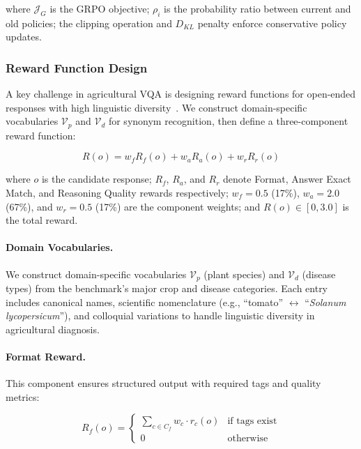 \documentclass[sigconf,anonymous,review]{acmart}
\begin{document}
\noindent where \(\mathcal{J}_G\) is the GRPO objective; \(\rho_i\) is the probability ratio between current and old policies; the clipping operation and $D_{KL}$ penalty enforce conservative policy updates.

\subsubsection{Reward Function Design}
\label{sec:reward}

A key challenge in agricultural VQA is designing reward functions for open-ended responses with high linguistic diversity~\cite{qian2025toolrl,eschmann2021reward,liu2024multimodal,lai2025med,pan2025medvlm}. We construct domain-specific vocabularies $\mathcal{V}_p$ and $\mathcal{V}_d$ for synonym recognition, then define a three-component reward function:

\begin{equation}
R(o) = w_f R_f(o) + w_a R_a(o) + w_r R_r(o)
\label{eq:total_reward}
\end{equation}

\noindent where $o$ is the candidate response; $R_f$, $R_a$, and $R_r$ denote Format, Answer Exact Match, and Reasoning Quality rewards respectively; $w_f=0.5$ (17\%), $w_a=2.0$ (67\%), and $w_r=0.5$ (17\%) are the component weights; and $R(o) \in [0, 3.0]$ is the total reward.

\paragraph{Domain Vocabularies.}
We construct domain-specific vocabularies $\mathcal{V}_p$ (plant species) and $\mathcal{V}_d$ (disease types) from the benchmark's major crop and disease categories. Each entry includes canonical names, scientific nomenclature (e.g., ``tomato'' $\leftrightarrow$ ``\emph{Solanum lycopersicum}''), and colloquial variations to handle linguistic diversity in agricultural diagnosis.


\paragraph{Format Reward.}
This component ensures structured output with required tags and quality metrics:

\begin{equation}
R_f(o) = \begin{cases}
\sum_{c \in C_f} w_c \cdot r_c(o) & \text{if tags exist} \\
0 & \text{otherwise}
\end{cases}
\label{eq:format_reward}
\end{equation}
\end{document}
